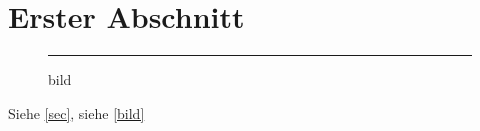 \documentclass[ngerman]{scrartcl}
\begin{document}
 
\section{Erster Abschnitt}\label{sec}
 
\begin{figure}
\rule{\textwidth}{1cm}
\caption{bild}\label{bild}
\end{figure}
 
Siehe \vref{sec}, siehe \vref{bild}
 
\end{document}
